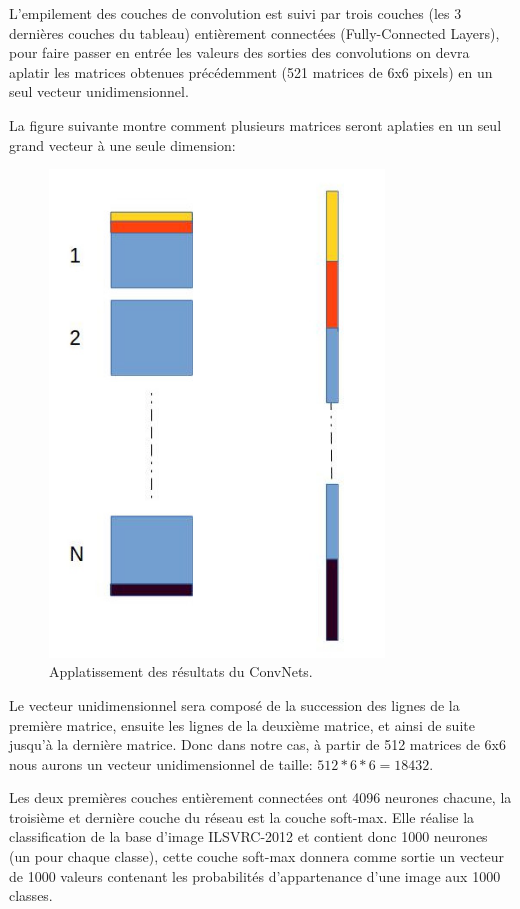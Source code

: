 	L'empilement des couches de convolution est suivi par trois couches (les 3 dernières couches du tableau) entièrement connectées (Fully-Connected Layers), pour faire passer en entrée les valeurs des sorties des convolutions on devra aplatir les matrices obtenues précédemment (521 matrices de 6x6 pixels) en un seul vecteur unidimensionnel.
	
	La figure suivante montre comment plusieurs matrices seront aplaties en un seul grand vecteur à une seule dimension:

\begin{figure}[H]
	\centering
		\includegraphics[width=3.5in]{Figures/flattening.jpg}
	\caption[An Electron]{Applatissement des résultats du ConvNets.}
	\label{fig:Electron}
\end{figure}

	Le vecteur unidimensionnel sera composé de la succession des lignes de la première matrice, ensuite les lignes de la deuxième matrice, et ainsi de suite jusqu'à la dernière matrice. Donc dans notre cas, à partir de 512 matrices de 6x6 nous aurons un vecteur unidimensionnel de taille: $512*6*6 = 18432$.

Les deux premières couches entièrement connectées ont 4096 neurones chacune, la troisième et dernière couche du réseau est la couche soft-max. Elle réalise la classification de la base d'image ILSVRC-2012 et contient donc 1000 neurones (un pour chaque classe), cette couche soft-max donnera comme sortie un vecteur de 1000 valeurs contenant les probabilités d'appartenance d'une image aux 1000 classes.

